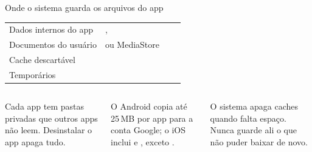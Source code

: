 \begin{frame}{Onde o sistema guarda os arquivos do app}
  \scriptsize
  \begin{tabularx}{\textwidth}{@{}p{2.5cm} p{2.6cm} p{3.4cm} >{\tiny}L@{}}
    \toprule
     &  &  & \scriptsize{} \\
    \midrule
    Dados internos do app & ,  &  &  \\
    Documentos do usuário &  ou MediaStore &  &  \\
    Cache descartável &  &  &  \\
    Temporários &  &  &  \\
    \bottomrule
  \end{tabularx}
  \normalsize
  \vspace{3pt}
  \begin{columns}[T]
    \begin{column}{0.32\textwidth}
      \begin{definicao}
        Cada app tem pastas privadas que outros apps não leem. Desinstalar o app apaga tudo.
      \end{definicao}
    \end{column}
    \begin{column}{0.32\textwidth}
      \begin{pordentro}
        O Android copia até 25\,MB por app para a conta Google; o iOS inclui  e , exceto .
      \end{pordentro}
    \end{column}
    \begin{column}{0.32\textwidth}
      \begin{atencao}
        O sistema apaga caches quando falta espaço. Nunca guarde ali o que não puder baixar de novo.
      \end{atencao}
    \end{column}
  \end{columns}
\end{frame}

